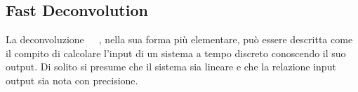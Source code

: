 \documentclass[12pt,a4paper,titlepage]{article}
\begin{document}
\subsection{Fast Deconvolution}
\label{subsec:FD_teoria}
La deconvoluzione~\cite{kirkeby:deconvolution_regularization}~\cite{kirkeby:deconvolution_analysis}~\cite{kirkeby:deconvolution_design}, nella sua forma più elementare, può essere descritta come il compito di calcolare l'input di un sistema a tempo discreto conoscendo il suo output. Di solito si presume che il sistema sia lineare e che la relazione input output sia nota con precisione. 
\end{document}
